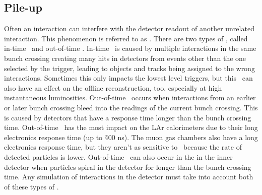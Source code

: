 \subsection{Pile-up}
\label{SECTION-ATLAS-PILEUP}

Often an interaction can interfere with the detector readout of another unrelated interaction. This phenomenon is referred to as \pileup. There are two types of \pileup, called in-time \pileup\ and out-of-time \pileup. In-time \pileup\ is caused by multiple interactions in the same bunch crossing creating many hits in detectors from events other than the one selected by the trigger, leading to objects and tracks being assigned to the wrong interactions. Sometimes this only impacts the lowest level triggers, but this \pileup\ can also have an effect on the offline reconstruction, too, especially at high instantaneous luminosities. Out-of-time \pileup\ occurs when interactions from an earlier or later bunch crossing bleed into the readings of the current bunch crossing. This \pileup is caused by detectors that have a response time longer than the bunch crossing time. Out-of-time \pileup\ has the most impact on the LAr calorimeters due to their long electronics response time (up to \~400 ns). The muon gas chambers also have a long electronics response time, but they aren't as sensitive to \pileup\ because the rate of detected particles is lower. Out-of-time \pileup\ can also occur in the in the inner detector when particles spiral in the detector for longer than the bunch crossing time. Any simulation of interactions in the detector must take into account both of these types of \pileup.

